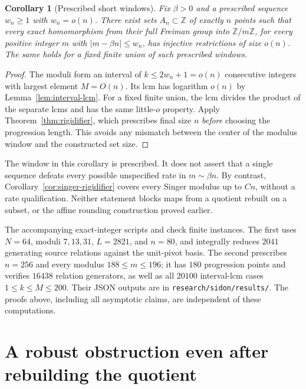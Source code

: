 \documentclass[11pt]{article}
\newtheorem{corollary}[theorem]{Corollary}
\theoremstyle{definition}
\theoremstyle{remark}
\newcommand{\Z}{\mathbb Z}
\begin{document}
\begin{corollary}[Prescribed short windows]\label{cor:window-rigidifier}
Fix $\beta>0$ and a prescribed sequence $w_n\ge1$ with $w_n=o(n)$.
There exist sets $A_n\subset\Z$ of exactly $n$ points such that every
exact homomorphism from their full Freiman group into $\Z/m\Z$, for
\emph{every} positive integer $m$ with
$|m-\beta n|\le w_n$, has injective restrictions of size $o(n)$.
The same holds for a fixed finite union of such prescribed windows.
\end{corollary}
\begin{proof}
The moduli form an interval of $k\le2w_n+1=o(n)$ consecutive integers
with largest element $M=O(n)$. Its lcm has logarithm $o(n)$ by
Lemma~\ref{lem:interval-lcm}. For a fixed finite union, the lcm divides
the product of the separate lcms and has the same little-$o$ property.
Apply Theorem~\ref{thm:rigidifier}, which prescribes final size $n$
\emph{before} choosing the progression length. This avoids any mismatch
between the center of the modulus window and the constructed set size.
\end{proof}

The window in this corollary is prescribed. It does not assert that a
single sequence defeats every possible unspecified rate in $m\sim\beta n$.
By contrast, Corollary~\ref{cor:singer-rigidifier} covers every Singer
modulus up to $Cn$, without a rate qualification.
Neither statement blocks maps from a quotient rebuilt on a subset, or
the affine rounding construction proved earlier.

The accompanying exact-integer scripts
 and
check finite instances. The first uses $N=64$, moduli $7,13,31$,
$L=2821$, and $n=80$, and integrally reduces $2041$ generating
source relations against the unit-pivot basis. The second prescribes
$n=256$ and every modulus $188\le m\le196$; it has $180$ progression
points and verifies $16438$ relation generators, as well as all
$20100$ interval-lcm cases $1\le k\le M\le200$.
Their JSON outputs are in \texttt{research/sidon/results/}.
The proofs above, including all asymptotic claims, are independent of
these computations.

\section{A robust obstruction even after rebuilding the quotient}
\label{sec:robust-cluster-obstruction}
\end{document}
